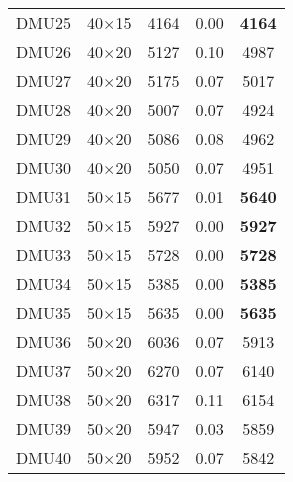 \begin{table}[H]
\begin{tabular}{@{}ccccc@{}}
DMU25 & 40$\times$15 & 4164 & 0.00 & \textbf{4164}\\ 
DMU26 & 40$\times$20 & 5127 & 0.10 & 4987\\ 
DMU27 & 40$\times$20 & 5175 & 0.07 & 5017\\ 
DMU28 & 40$\times$20 & 5007 & 0.07 & 4924\\ 
DMU29 & 40$\times$20 & 5086 & 0.08 & 4962\\ 
DMU30 & 40$\times$20 & 5050 & 0.07 & 4951\\ 
DMU31 & 50$\times$15 & 5677 & 0.01 & \textbf{5640}\\ 
DMU32 & 50$\times$15 & 5927 & 0.00 & \textbf{5927}\\ 
DMU33 & 50$\times$15 & 5728 & 0.00 & \textbf{5728}\\ 
DMU34 & 50$\times$15 & 5385 & 0.00 & \textbf{5385}\\ 
DMU35 & 50$\times$15 & 5635 & 0.00 & \textbf{5635}\\ 
DMU36 & 50$\times$20 & 6036 & 0.07 & 5913\\ 
DMU37 & 50$\times$20 & 6270 & 0.07 & 6140\\ 
DMU38 & 50$\times$20 & 6317 & 0.11 & 6154\\ 
DMU39 & 50$\times$20 & 5947 & 0.03 & 5859\\ 
DMU40 & 50$\times$20 & 5952 & 0.07 & 5842\\ \bottomrule
\end{tabular}
\end{table}

